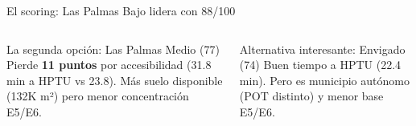 \documentclass[aspectratio=169, 11pt]{beamer}
\begin{document}
\begin{frame}{El scoring: Las Palmas Bajo lidera con 88/100}
\begin{columns}[T]
\begin{block}{\small La segunda opción: Las Palmas Medio (77)}
\small Pierde \textbf{11 puntos} por accesibilidad (31.8 min a HPTU vs 23.8).
Más suelo disponible (132K m²) pero menor concentración E5/E6.
\end{block}

\vspace{4pt}
\begin{block}{\small Alternativa interesante: Envigado (74)}
\small Buen tiempo a HPTU (22.4 min). Pero es municipio autónomo (POT distinto) y menor base E5/E6.
\end{block}
\end{columns}
\end{frame}

\end{document}

